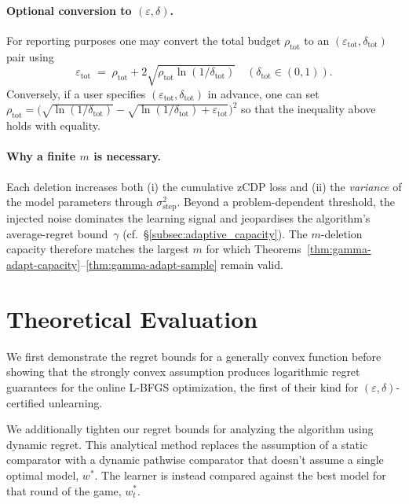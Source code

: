 \documentclass[a4paper,12pt]{article}
\begin{document}
\paragraph{Optional conversion to {$(\varepsilon,\delta)$}.}
For reporting purposes one may convert the total budget
\(\rho_{\text{tot}}\) to an \((\varepsilon_{\text{tot}},\delta_{\text{tot}})\)
pair using
\[
  \varepsilon_{\text{tot}}
  \;=\;
  \rho_{\text{tot}} + 2\sqrt{\rho_{\text{tot}}\ln(1/\delta_{\text{tot}})}
  \quad (\delta_{\text{tot}}\in(0,1)).
\]
Conversely, if a user specifies \((\varepsilon_{\text{tot}},\delta_{\text{tot}})\)
in advance, one can set
\(
  \rho_{\text{tot}}
  =\bigl(\sqrt{\ln(1/\delta_{\text{tot}})}
         -\sqrt{\ln(1/\delta_{\text{tot}})+\varepsilon_{\text{tot}}}\bigr)^{2}
\)
so that the inequality above holds with equality.

\paragraph{Why a finite $m$ is necessary.}
Each deletion increases both (i) the cumulative zCDP loss and
(ii) the \emph{variance} of the model parameters through \(\sigma_{\text{step}}^{2}\).
Beyond a problem-dependent threshold, the injected noise dominates the
learning signal and jeopardises the algorithm’s average-regret
bound~\(\gamma\) (cf.\ \S\ref{subsec:adaptive_capacity}).
The $m$-deletion capacity therefore matches the largest $m$ for which
Theorems~\ref{thm:gamma-adapt-capacity}–\ref{thm:gamma-adapt-sample}
remain valid.


\section{Theoretical Evaluation}
\label{sec:theory}

We first demonstrate the regret bounds for a generally convex function before showing that the strongly convex assumption produces logarithmic regret guarantees for the online L-BFGS optimization, the first of their kind for $(\varepsilon,\delta)$-certified unlearning.

We additionally tighten our regret bounds for analyzing the algorithm using dynamic regret. This analytical method replaces the assumption of a static comparator with a dynamic pathwise comparator that doesn't assume a single optimal model, $w^{*}$. The learner is instead compared against the best model for that round of the game, $w_{t}^{*}$. 
\end{document}

